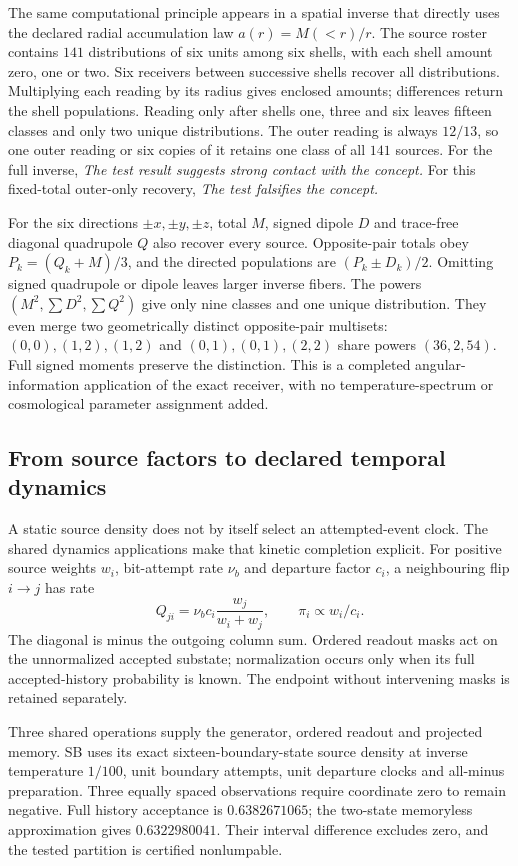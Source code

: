 The same computational principle appears in a spatial inverse that directly uses the declared radial accumulation law $a(r)=M(<r)/r$. The source roster contains $141$ distributions of six units among six shells, with each shell amount zero, one or two. Six receivers between successive shells recover all distributions. Multiplying each reading by its radius gives enclosed amounts; differences return the shell populations. Reading only after shells one, three and six leaves fifteen classes and only two unique distributions. The outer reading is always $12/13$, so one outer reading or six copies of it retains one class of all $141$ sources. For the full inverse, \emph{The test result suggests strong contact with the concept.} For this fixed-total outer-only recovery, \emph{The test falsifies the concept.}

For the six directions $\pm x,\pm y,\pm z$, total $M$, signed dipole $D$ and trace-free diagonal quadrupole $Q$ also recover every source. Opposite-pair totals obey $P_k=(Q_k+M)/3$, and the directed populations are $(P_k\pm D_k)/2$. Omitting signed quadrupole or dipole leaves larger inverse fibers. The powers $(M^2,\sum D^2,\sum Q^2)$ give only nine classes and one unique distribution. They even merge two geometrically distinct opposite-pair multisets: $(0,0),(1,2),(1,2)$ and $(0,1),(0,1),(2,2)$ share powers $(36,2,54)$. Full signed moments preserve the distinction. This is a completed angular-information application of the exact receiver, with no temperature-spectrum or cosmological parameter assignment added.

\subsection{From source factors to declared temporal dynamics}

A static source density does not by itself select an attempted-event clock. The shared dynamics applications make that kinetic completion explicit. For positive source weights $w_i$, bit-attempt rate $\nu_b$ and departure factor $c_i$, a neighbouring flip $i\to j$ has rate
\[
 Q_{ji}=\nu_b c_i\frac{w_j}{w_i+w_j},
 \qquad \pi_i\propto w_i/c_i.
\]
The diagonal is minus the outgoing column sum. Ordered readout masks act on the unnormalized accepted substate; normalization occurs only when its full accepted-history probability is known. The endpoint without intervening masks is retained separately. 

Three shared operations supply the generator, ordered readout and projected memory. SB uses its exact sixteen-boundary-state source density at inverse temperature $1/100$, unit boundary attempts, unit departure clocks and all-minus preparation. Three equally spaced observations require coordinate zero to remain negative. Full history acceptance is $0.6382671065$; the two-state memoryless approximation gives $0.6322980041$. Their interval difference excludes zero, and the tested partition is certified nonlumpable.

